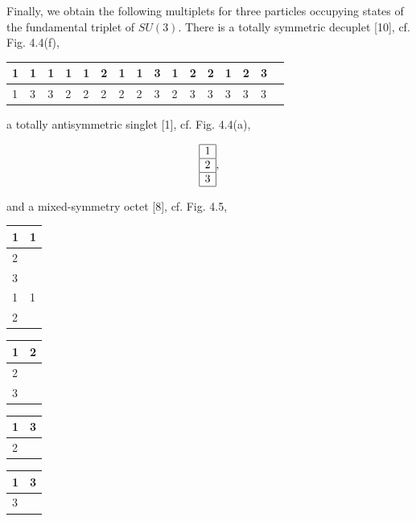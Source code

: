 \documentclass[10pt, letterpaper]{article}
\begin{document}
Finally, we obtain the following multiplets for three particles occupying states of the fundamental triplet of $S U(3)$. There is a totally symmetric decuplet [10], cf. Fig. 4.4(f),

\begin{center}
\begin{tabular}{|l|l|l|l|l|l|l|l|l|l|l|l|l|l|l|l|}
\hline
1 & 1 & 1 & 1 & 1 & 2 & 1 & 1 & 3 & 1 & 2 & 2 & 1 & 2 & 3 &  \\
\hline
1 & 3 & 3 & 2 & 2 & 2 & 2 & 2 & 3 & 2 & 3 & 3 & 3 & 3 & 3 &  \\
\hline
\end{tabular}
\end{center}

a totally antisymmetric singlet [1], cf. Fig. 4.4(a),

$$
\begin{array}{|l|}
\hline 1 \\
\hline 2 \\
\hline 3 \\
\hline
\end{array},
$$

and a mixed-symmetry octet [8], cf. Fig. 4.5,

\begin{center}
\begin{tabular}{|l|l|}
\hline
1 & 1 \\
\hline
2 &  \\
\hline
3 &  \\
\hline
1 & 1 \\
\hline
2 &  \\
\hline
\end{tabular}
\end{center} \begin{tabular}{|l|l|}
\hline
1 & 2 \\
\hline
2 &  \\
\hline
3 &  \\
\hline
\end{tabular}

\begin{center}
\begin{tabular}{|l|l|}
\hline
1 & 3 \\
\hline
2 &  \\
\hline
\end{tabular}
\end{center}

\begin{center}
\begin{tabular}{|l|l|}
\hline
1 & 3 \\
\hline
3 &  \\
\hline
\end{tabular}
\end{center}
\end{document}
